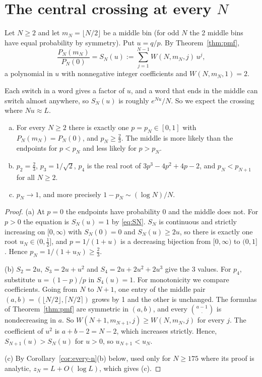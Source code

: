 \section{The central crossing at every \texorpdfstring{$N$}{N}}\label{sec:middle}

Let $N\ge2$ and let $m_N=\lfloor N/2\rfloor$ be a middle bin (for odd $N$ the
2 middle bins have equal probability by symmetry). Put $u=q/p$. By Theorem~\ref{thm:pmf},
\begin{equation}\label{eq:SN}
\frac{P_N(m_N)}{P_N(0)}=S_N(u):=\sum_{j=1}^{N-1}W(N,m_N,j)\,u^j ,
\end{equation}
a polynomial in $u$ with nonnegative integer coefficients and $W(N,m_N,1)=2$.

Each switch in a word gives a factor of $u$, and a word that ends in the middle can switch almost
anywhere, so $S_N(u)$ is roughly $e^{Nu}/N$. So we expect the crossing where $Nu\approx L$.

\begin{theorem}\label{thm:root}
\begin{enumerate}[(a)]
\item For every $N\ge2$ there is exactly one $p=p_N\in[0,1]$ with $P_N(m_N)=P_N(0)$, and
$p_N\ge\tfrac23$. The middle is more likely than the endpoints for $p<p_N$ and less likely for
$p>p_N$.
\item $p_2=\tfrac23$, $p_3=1/\sqrt2$, $p_4$ is the real root of $3p^3-4p^2+4p-2$, and
$p_N<p_{N+1}$ for all $N\ge2$.
\item $p_N\to1$, and more precisely $1-p_N\sim(\log N)/N$.
\end{enumerate}
\end{theorem}

\begin{proof}
(a) At $p=0$ the endpoints have probability $0$ and the middle does not. For $p>0$ the equation is
$S_N(u)=1$ by \eqref{eq:SN}. $S_N$ is continuous and strictly increasing on $[0,\infty)$ with
$S_N(0)=0$ and $S_N(u)\ge2u$, so there is exactly one root $u_N\in(0,\tfrac12]$, and $p=1/(1+u)$ is a
decreasing bijection from $[0,\infty)$ to $(0,1]$. Hence $p_N=1/(1+u_N)\ge\tfrac23$.

(b) $S_2=2u$, $S_3=2u+u^2$ and $S_4=2u+2u^2+2u^3$ give the 3 values. For $p_4$, substitute
$u=(1-p)/p$ in $S_4(u)=1$. For monotonicity we compare coefficients. Going from $N$ to $N+1$, one
entry of the middle pair $(a,b)=(\lfloor N/2\rfloor,\lceil N/2\rceil)$ grows by 1 and the other is
unchanged. The formulas of Theorem~\ref{thm:pmf} are symmetric in $(a,b)$, and every
$\binom{a-1}{\cdot}$ is nondecreasing in $a$. So $W(N+1,m_{N+1},j)\ge W(N,m_N,j)$ for every $j$. The coefficient of $u^2$
is $a+b-2=N-2$, which increases strictly. Hence, $S_{N+1}(u)>S_N(u)$ for $u>0$, so
$u_{N+1}<u_N$.

(c) By Corollary~\ref{cor:every-n}(b) below, used only for $N\ge175$ where its proof is analytic,
$z_N=L+O(\log L)$, which gives (c).
\end{proof}

